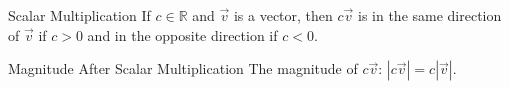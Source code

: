 \documentclass[12pt,a4paper]{article}
\def\R{{\mathbb{R}}}
\begin{document}
\begin{enumerate}
\begin{center}
	\end{center}
	\begin{df}{Scalar Multiplication}
		If $c\in\R$ and $\vec{v}$ is a vector, then $c\vec{v}$ is in the same direction of $\vec{v}$ if $c>0$ and in the opposite direction if $c<0$.
	\end{df}
	\begin{thm}{Magnitude After Scalar Multiplication}
		The magnitude of $c\vec{v}$: $|c\vec{v}|=c|\vec{v}|$.	
	\end{thm}
\end{enumerate}
\end{document}
